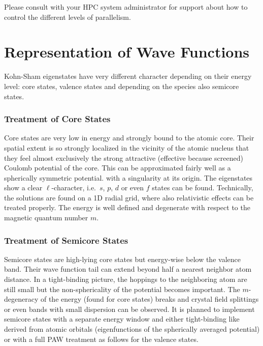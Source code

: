 \documentclass[oribibl]{llncs}
\begin{document}
\noindent
Please consult with your \ac{HPC} system administrator for support
about how to control the different levels of parallelism.

\section{Representation of Wave Functions} \label{sec:representation}
%
Kohn-Sham eigenstates have very different character depending on their energy level: core states, valence states and depending on the species also semicore states.
%
%
\subsubsection{Treatment of Core States} \label{sec:core-states}
%
Core states are very low in energy and strongly bound 
to the atomic core.
Their spatial extent is so strongly localized 
in the vicinity of the atomic nucleus 
that they feel almost exclusively the strong attractive 
(effective because screened) Coulomb potential of the core. 
This can be approximated fairly well as a spherically symmetric potential.
with a singularity at its origin.
The eigenstates show a clear $\ell$-character, 
i.e.~$s$, $p$, $d$ or even $f$ states can be found.
Technically, the solutions are found on a 1D radial grid,
where also relativistic effects can be treated properly.
The energy is well defined and degenerate with respect to
the magnetic quantum number $m$.

%
%
\subsubsection{Treatment of Semicore States} \label{sec:semincore-states}
%
Semicore states are high-lying core states
but energy-wise below the valence band.
Their wave function tail can extend beyond half a nearest neighbor atom distance.
In a tight-binding picture, the hoppings to the neighboring atom are still small
but the non-sphericality of the potential becomes important.
The $m$-degeneracy of the energy (found for core states) breaks 
and crystal field splittings or even bands with small dispersion can be observed.
It is planned to implement semicore states with a separate energy window
and either tight-binding like derived from atomic orbitals 
(eigenfunctions of the spherically averaged potential) 
or with a full \ac{PAW} treatment as follows for the valence states.

%
%
\end{document}
